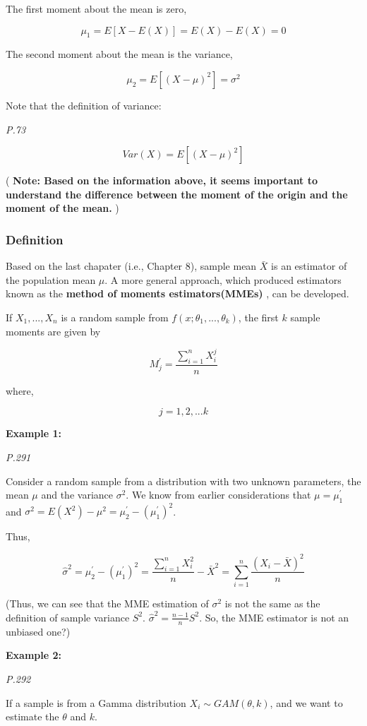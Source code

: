 \documentclass[]{book}
\begin{document}
The first moment about the mean is zero,

\[\mu_1=E[X-E(X)]=E(X)-E(X)=0\]

The second moment about the mean is the variance,

\[\mu_2=E[(X-\mu)^2]=\sigma^2\]

Note that the definition of variance:

\emph{P.73}

\[Var(X)=E[(X-\mu)^2]\]

( \textbf{Note: Based on the information above, it seems important to understand the difference between the moment of the origin and the moment of the mean.} )

\hypertarget{definition}{%
\subsubsection{Definition}\label{definition}}

Based on the last chapater (i.e., Chapter 8), sample mean \(\bar{X}\) is an estimator of the population mean \(\mu\). A more general approach, which produced estimators known as the \textbf{method of moments estimators(MMEs)} , can be developed.

If \(X_1,...,X_n\) is a random sample from \(f(x; \theta_1,...,\theta_k)\), the first \(k\) sample moments are given by

\[M_j^{'}=\frac{\sum_{i=1}^n X_i^j}{n}\]

where,

\[j=1,2,...k\]

\textbf{Example 1:}

\emph{P.291}

Consider a random sample from a distribution with two unknown parameters, the mean \(\mu\) and the variance \(\sigma^2\). We know from earlier considerations that \(\mu=\mu^{'}_1\) and \(\sigma^2=E(X^2)-\mu^2=\mu_2^{'}-(\mu^{'}_1)^2\).

Thus,

\[\hat{\sigma}^2=\mu_2^{'}-(\mu^{'}_1)^2=\frac{\sum_{i=1}^n X_i^2}{n}-\bar{X}^2=\sum_{i=1}^n \frac{(X_i-\bar{X})^2}{n}\]

(Thus, we can see that the MME estimation of \(\sigma^2\) is not the same as the definition of sample variance \(S^2\). \(\hat{\sigma}^2=\frac{n-1}{n}S^2\). So, the MME estimator is not an unbiased one?)

\textbf{Example 2:}

\emph{P.292}

If a sample is from a Gamma distribution \(X_i \sim GAM(\theta,k)\), and we want to estimate the \(\theta\) and \(k\).
\end{document}
